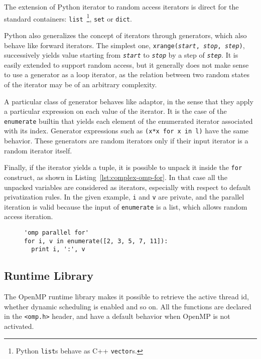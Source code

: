 \documentclass{llncs}
\begin{document}
The extension of Python iterator to random access iterators is direct for the
standard containers: \texttt{list}~\footnote{Python \texttt{list}s behave as C++
\texttt{vector}s.}, \texttt{set} or \texttt{dict}.

Python also generalizes the concept of iterators through generators, which also
behave like forward iterators. The simplest one, \texttt{xrange(\emph{start},
\emph{stop}, \emph{step})}, successively yields value starting from
\texttt\emph{start} to \texttt\emph{stop} by a step of \texttt\emph{step}. It is
easily extended to support random access, but it generally does not make
sense to use a generator as a loop iterator, as the relation between two
random states of the iterator may be of an arbitrary complexity.

A particular class of generator behaves like adaptor, in the sense that they
apply a particular expression on each value of the iterator. It is the case of
the \texttt{enumerate} builtin that yields each element of the enumerated
iterator associated with its index. Generator expressions such as \texttt{(x*x
for x in l)} have the same behavior. These generators are random iterators only
if their input iterator is a random iterator itself.

Finally, if the iterator yields a tuple, it is possible to unpack it inside the
\texttt{for} construct, as shown in Listing~\ref{lst:complex-omp-for}. In that case
all the unpacked variables are considered as iterators, especially with respect
to default privatization rules. In the given example, \texttt{i} and \texttt{v}
are private, and the parallel iteration is valid because the input of
\texttt{enumerate} is a list, which allows random access iteration.

\begin{figure}
    \begin{lstlisting}[label={lst:complex-omp-for}, caption={Parallel
    loop with tuple unpacking.}]
'omp parallel for'
for i, v in enumerate([2, 3, 5, 7, 11]):
  print i, ':', v
  \end{lstlisting}
\end{figure}

\subsection{Runtime Library}

The OpenMP runtime library makes it possible to retrieve the active thread id,
whether dynamic scheduling is enabled and so on. All the functions are declared
in the \texttt{<omp.h>} header, and have a default behavior when OpenMP is not
activated.
\end{document}
